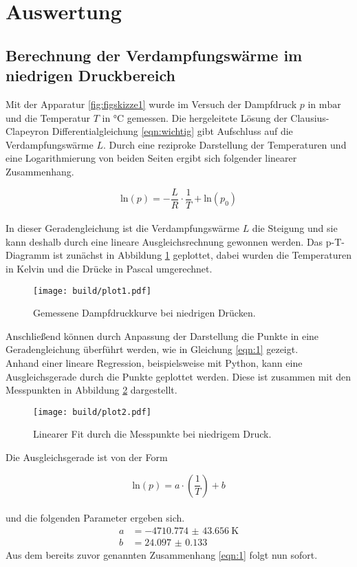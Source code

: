 \section{Auswertung}

\subsection{Berechnung der Verdampfungswärme im niedrigen Druckbereich}

Mit der Apparatur \ref{fig:figskizze1} wurde im Versuch der Dampfdruck $p$ in $\si{\milli\bar}$ und die Temperatur $T$ in $\si{\celsius}$ gemessen. Die hergeleitete Lösung 
der Clausius-Clapeyron Differentialgleichung \eqref{eqn:wichtig} gibt Aufschluss auf die Verdampfungswärme $L$. Durch eine reziproke Darstellung der Temperaturen und eine Logarithmierung von beiden Seiten
ergibt sich folgender linearer Zusammenhang.

\begin{equation}
\label{eqn:1}
\text{ln}(p) = - \frac{L}{R} \cdot \frac{1}{T} + \text{ln}(p_{0})
\end{equation}
\\
In dieser Geradengleichung ist die Verdampfungswärme $L$ die Steigung und sie kann deshalb durch eine lineare Ausgleichsrechnung gewonnen werden.
Das p-T-Diagramm ist zunächst in Abbildung \ref{fig:plot1} geplottet, dabei wurden die Temperaturen in Kelvin und die Drücke in Pascal umgerechnet.
\begin{figure}[h]
    \centering
    \texttt{[image: build/plot1.pdf]}
    \caption{Gemessene Dampfdruckkurve bei niedrigen Drücken.}
    \label{fig:plot1}
  \end{figure}
Anschließend können durch Anpassung der Darstellung die Punkte in eine Geradengleichung überführt werden, wie in Gleichung \eqref{eqn:1} gezeigt. 
\\
Anhand einer lineare Regression, beispielsweise mit Python, kann eine Ausgleichsgerade durch die Punkte geplottet werden. Diese ist zusammen mit den Messpunkten in Abbildung \ref{fig:plot2} dargestellt.
\begin{figure}[h]
    \centering
    \texttt{[image: build/plot2.pdf]}
    \caption{Linearer Fit durch die Messpunkte bei niedrigem Druck.}
    \label{fig:plot2}
\end{figure}
Die Ausgleichsgerade ist von der Form

\begin{equation}
\text{ln}(p) = a \cdot \left( \frac{1}{T}\right) +b
\end{equation}
\\
und die folgenden Parameter ergeben sich.
\begin{align}
a &= \SI{-4710.774(43656)}{\kelvin} \\
b &= \SI{24.097(0133)}{}
\end{align}
Aus dem bereits zuvor genannten Zusammenhang \eqref{eqn:1} folgt nun sofort.

